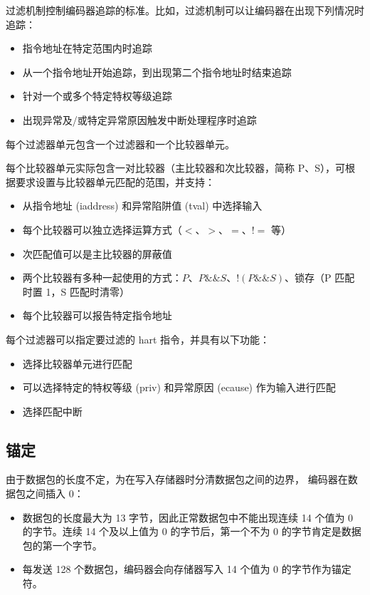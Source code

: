 \documentclass[main\_\_CN.tex]{subfiles}
\begin{document}
过滤机制控制编码器追踪的标准。比如，过滤机制可以让编码器在出现下列情况时追踪：
\begin{itemize}
    \item 指令地址在特定范围内时追踪
    \item 从一个指令地址开始追踪，到出现第二个指令地址时结束追踪
    \item 针对一个或多个特定特权等级追踪
    \item 出现异常及/或特定异常原因触发中断处理程序时追踪
\end{itemize}

每个过滤器单元包含一个过滤器和一个比较器单元。

每个比较器单元实际包含一对比较器（主比较器和次比较器，简称 P、S），可根据要求设置与比较器单元匹配的范围，并支持：

\begin{itemize}
    \item 从指令地址 (iaddress) 和异常陷阱值 (tval) 中选择输入
    \item 每个比较器可以独立选择运算方式（$<$、$>$、$=$、$!=$ 等）
    \item 次匹配值可以是主比较器的屏蔽值
    \item 两个比较器有多种一起使用的方式：$P$、$P\&\&S$、$!(P\&\&S)$、锁存（P 匹配时置 1，S 匹配时清零）
    \item 每个比较器可以报告特定指令地址
\end{itemize}

每个过滤器可以指定要过滤的 hart 指令，并具有以下功能：
\begin{itemize}
    \item 选择比较器单元进行匹配
    \item 可以选择特定的特权等级 (priv) 和异常原因 (ecause) 作为输入进行匹配
    \item 选择匹配中断
\end{itemize}

\subsection{锚定}

由于数据包的长度不定，为在写入存储器时分清数据包之间的边界，\chipname{} 编码器在数据包之间插入 0：

\begin{itemize}
    \item 数据包的长度最大为 13 字节，因此正常数据包中不能出现连续 14 个值为 0 的字节。连续 14 个及以上值为 0 的字节后，第一个不为 0 的字节肯定是数据包的第一个字节。
    \item 每发送 128 个数据包，编码器会向存储器写入 14 个值为 0 的字节作为锚定符。
\end{itemize}
\end{document}
